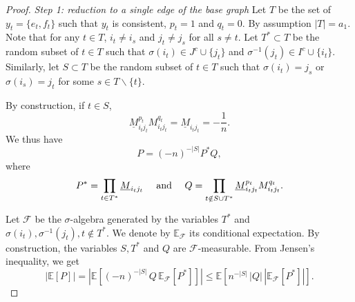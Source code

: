 \documentclass[11pt]{article}
\newcommand{\dE}{\mathbb {E}}
\newcommand{\cF}{\mathcal {F}}
\newcommand{\ABS}[1]{{{\left| #1 \right|}}} %
\newcommand{\SBRA}[1]{{{\left[#1\right]}}} %
\newcommand{\1}{1\!\!{\sf I}}\newcommand{\IND}{\1}
\begin{document}
\begin{proof}  {\em Step 1: reduction to a single edge of the base graph}
Let $T$ be the set of $y_t = \{e_t , f_t \}$ such that $y_t$ is consistent, $p_t = 1$ and $q_t = 0$.  By assumption $|T| = a_1$. Note that for any $t \in T$, $i_t \ne i_s$ and $j_t \ne j_s$ for all $s \ne t$. Let $T^*\subset T$ be the random subset of $t \in T$ such that $\sigma(i_t) \in J^c \cup \{ j_t \}$ and $\sigma^{-1} (j_t) \in I^c\cup \{ i_t \}$. Similarly, let $S \subset T$ be the random subset of $t \in T$ such that $\sigma(i_t) = j_s$ or  $\sigma(i_s) = j_t$ for some $s \in T \backslash \{t \}$. 


By construction, if $t \in S$, 
$$
 \underline M_{i_t j_t} ^{p_t}  M_{i_t j_t} ^{q_t} =  \underline M_{i_t j_t}   =  - \frac {1}{n}.
$$
We thus have 
$$
P = (-n)^{-|S|} P^* Q,
$$
where 
$$
P^*  = \prod_{t \in T^*}  \underline M_{i_tj_t}  \quad \hbox{ and } \quad Q =  \prod_{t\notin  S \cup T^* }   \underline M_{i_tj_t} ^{p_t}  M_{i_t j_t} ^{q_t} . 
$$

Let $\cF$  be the $\sigma$-algebra generated by the variables $T^*$ and $\sigma(i_t), \sigma^{-1}(j_t) , t \notin  T^*$. We denote by $\dE_{\cF}$ its conditional expectation. By construction, the variables $S,T^*$ and $Q$ are  $\cF$-measurable. From Jensen's inequality, we get
\begin{equation}\label{eqM:defPQP}
\ABS{ \dE \SBRA{ P}} = \ABS{ \dE \SBRA{(-n)^{-|S|} \, Q  \, \dE_{\cF} \SBRA{P^*} }} \leq   \dE \SBRA{ n^{-|S|} \, |Q| \,  \ABS{ \dE_{\cF} \SBRA{P^*} }}. 
\end{equation}



\end{proof}
\end{document}

